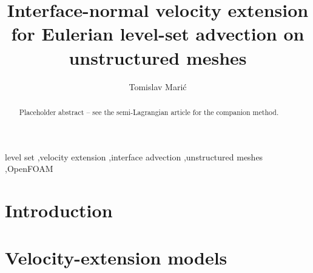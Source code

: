\documentclass[preprint,3p,11pt]{elsarticle}
\begin{document}
\begin{frontmatter}
\title{Interface-normal velocity extension for Eulerian level-set advection on
       unstructured meshes}
\author[tud]{Tomislav Mari\'c}
\address[tud]{Mathematical Modeling and Analysis, Technische Universit\"at Darmstadt, Germany}

\begin{abstract}
Placeholder abstract -- see the semi-Lagrangian article for the companion method.
\end{abstract}

\begin{keyword}
level set \sep velocity extension \sep interface advection \sep unstructured meshes \sep OpenFOAM
\end{keyword}
\end{frontmatter}

\section{Introduction}
\label{sec:intro}

\section{Velocity-extension models}
\label{sec:models}
\end{document}
